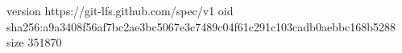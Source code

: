 version https://git-lfs.github.com/spec/v1
oid sha256:a9a3408f56af7bc2ae3bc5067e3c7489c04f61c291c103cadb0aebbc168b5288
size 351870
